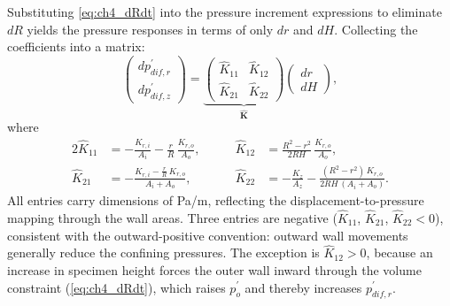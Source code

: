 \documentclass[../main]{subfiles}
\begin{document}
Substituting \cref{eq:ch4_dRdt} into the pressure increment expressions to eliminate $dR$ yields the pressure responses in terms of only $dr$ and $dH$. Collecting the coefficients into a matrix:
\begin{equation}
\begin{pmatrix} dp_{dif,r}^{\prime} \\[4pt] dp_{dif,z}^{\prime} \end{pmatrix}
=
\underbrace{\begin{pmatrix} \hat{K}_{11} & \hat{K}_{12} \\[8pt] \hat{K}_{21} & \hat{K}_{22} \end{pmatrix}}_{\hat{\mathbf{K}}}
\begin{pmatrix} dr \\[4pt] dH \end{pmatrix},
\label{eq:ch4_stiffness_matrix}
\end{equation}
where
\begin{alignat}{2}
\hat{K}_{11} &= -\frac{K_{r,i}}{A_i}-\frac{r}{R}\,\frac{K_{r,o}}{A_o}, &\qquad
\hat{K}_{12} &= \frac{R^2-r^2}{2RH}\,\frac{K_{r,o}}{A_o}, \label{eq:ch4_Khat_row1}\\[4pt]
\hat{K}_{21} &= -\frac{K_{r,i}-\frac{r}{R}\,K_{r,o}}{A_i+A_o}, &\qquad
\hat{K}_{22} &= -\frac{K_z}{A_z}-\frac{(R^2-r^2)\,K_{r,o}}{2RH\,(A_i+A_o)}. \label{eq:ch4_Khat_row2}
\end{alignat}
All entries carry dimensions of Pa/m, reflecting the displacement-to-pressure mapping through the wall areas. Three entries are negative ($\hat{K}_{11}$, $\hat{K}_{21}$, $\hat{K}_{22}<0$), consistent with the outward-positive convention: outward wall movements generally reduce the confining pressures. The exception is $\hat{K}_{12}>0$, because an increase in specimen height forces the outer wall inward through the volume constraint (\cref{eq:ch4_dRdt}), which raises $p_o^{\prime}$ and thereby increases $p_{dif,r}^{\prime}$.
\end{document}

